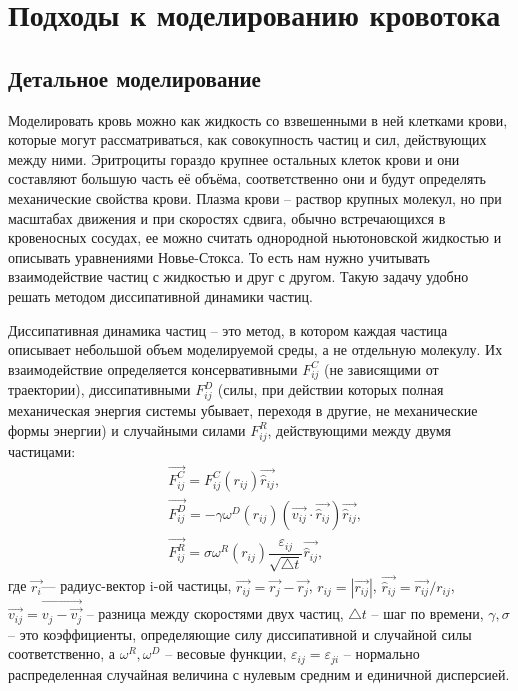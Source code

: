 
\section{Подходы к моделированию кровотока}
\subsection{Детальное моделирование}
Моделировать кровь можно как жидкость со взвешенными в ней клетками крови, которые могут рассматриваться, как совокупность частиц и сил,
действующих между ними. Эритроциты гораздо крупнее остальных клеток крови и они составляют большую часть её объёма, соответственно они 
и будут определять механические свойства крови. Плазма крови -- раствор крупных молекул, но при масштабах движения и при скоростях
сдвига, обычно встречающихся в кровеносных сосудах, ее можно считать однородной ньютоновской жидкостью  и описывать уравнениями
Новье-Стокса. То есть нам нужно учитывать взаимодействие частиц с жидкостью и друг с другом. Такую задачу удобно решать методом 
диссипативной динамики частиц.

Диссипативная динамика частиц -- это метод, в котором каждая частица описывает небольшой объем моделируемой среды, 
а не отдельную молекулу. Их взаимодействие определяется консервативными $F^C_{ij}$ (не зависящими от траектории), диссипативными 
$F^D_{ij}$ (силы, при действии которых полная механическая энергия  системы убывает, переходя в другие, не механические формы энергии) 
и случайными силами $F^R_{ij}$, действующими между двумя частицами:
\begin{align*}
  &\vec{F^C_{ij}}=F^C_{ij}(r_{ij})\vec{\hat{r}{_{ij}}},\\[10pt]
  &\vec{F^D_{ij}}=-\gamma \omega^D(r_{ij}) (\vec{v_{ij}} \cdot \vec{\hat{r}{_{ij}}})\vec{\hat{r}{_{ij}}},\\[10pt]
  &\vec{F^R_{ij}}=\sigma \omega^R(r_{ij}) \dfrac{\varepsilon_{ij}}{\sqrt{\bigtriangleup t}} \vec{\hat{r}{_{ij}}},
\end{align*}
где $\vec{r_{i}}$— радиус-вектор i-ой частицы, $\vec{r_{ij}}=\vec{r_{j}} - \vec{r_{j}}$,
$r_{ij}=|\vec{r_{ij}}|$,
$\vec{\hat{r}{_{ij}}}=\vec{r_{ij}}/{r_{ij}}$,
$\vec{v_{ij}}=\vec{v_{j} - \vec{v_{j}}}$ -- разница между скоростями двух частиц, $\bigtriangleup t$ -- шаг по времени, 
$\gamma, \sigma$ -- это  коэффициенты, определяющие силу диссипативной и случайной силы соответственно, а $\omega^R,\omega^D$ -- весовые функции,
${\varepsilon_{ij}={\varepsilon_{ji}}}$ -- нормально распределенная случайная величина с нулевым средним и единичной дисперсией.

